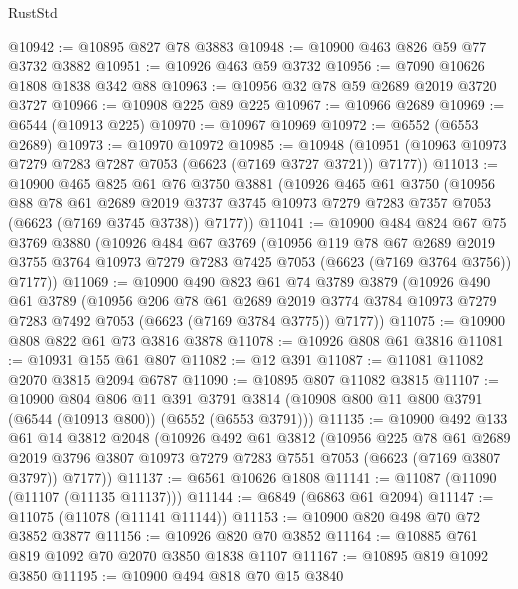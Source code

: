 \begin{lexlean}{RustStd}
\begin{coremodule}
@10942 := @10895 @827 @78 @3883
@10948 := @10900 @463 @826 @59 @77 @3732 @3882
@10951 := @10926 @463 @59 @3732
@10956 := @7090 @10626 @1808 @1838 @342 @88
@10963 := @10956 @32 @78 @59 @2689 @2019 @3720 @3727
@10966 := @10908 @225 @89 @225
@10967 := @10966 @2689
@10969 := @6544 (@10913 @225)
@10970 := @10967 @10969
@10972 := @6552 (@6553 @2689)
@10973 := @10970 @10972
@10985 := @10948 (@10951 (@10963 @10973 @7279 @7283 @7287 @7053 (@6623 (@7169 @3727 @3721)) @7177))
@11013 := @10900
    @465
    @825
    @61
    @76
    @3750
    @3881
    (@10926
      @465
      @61
      @3750
      (@10956
        @88
        @78
        @61
        @2689
        @2019
        @3737
        @3745
        @10973
        @7279
        @7283
        @7357
        @7053
        (@6623 (@7169 @3745 @3738))
        @7177))
@11041 := @10900
    @484
    @824
    @67
    @75
    @3769
    @3880
    (@10926
      @484
      @67
      @3769
      (@10956
        @119
        @78
        @67
        @2689
        @2019
        @3755
        @3764
        @10973
        @7279
        @7283
        @7425
        @7053
        (@6623 (@7169 @3764 @3756))
        @7177))
@11069 := @10900
    @490
    @823
    @61
    @74
    @3789
    @3879
    (@10926
      @490
      @61
      @3789
      (@10956
        @206
        @78
        @61
        @2689
        @2019
        @3774
        @3784
        @10973
        @7279
        @7283
        @7492
        @7053
        (@6623 (@7169 @3784 @3775))
        @7177))
@11075 := @10900 @808 @822 @61 @73 @3816 @3878
@11078 := @10926 @808 @61 @3816
@11081 := @10931 @155 @61 @807
@11082 := @12 @391
@11087 := @11081 @11082 @2070 @3815 @2094 @6787
@11090 := @10895 @807 @11082 @3815
@11107 := @10900
    @804
    @806
    @11
    @391
    @3791
    @3814
    (@10908 @800 @11 @800 @3791 (@6544 (@10913 @800)) (@6552 (@6553 @3791)))
@11135 := @10900
    @492
    @133
    @61
    @14
    @3812
    @2048
    (@10926
      @492
      @61
      @3812
      (@10956
        @225
        @78
        @61
        @2689
        @2019
        @3796
        @3807
        @10973
        @7279
        @7283
        @7551
        @7053
        (@6623 (@7169 @3807 @3797))
        @7177))
@11137 := @6561 @10626 @1808
@11141 := @11087 (@11090 (@11107 (@11135 @11137)))
@11144 := @6849 (@6863 @61 @2094)
@11147 := @11075 (@11078 (@11141 @11144))
@11153 := @10900 @820 @498 @70 @72 @3852 @3877
@11156 := @10926 @820 @70 @3852
@11164 := @10885 @761 @819 @1092 @70 @2070 @3850 @1838 @1107
@11167 := @10895 @819 @1092 @3850
@11195 := @10900
    @494
    @818
    @70
    @15
    @3840

\end{coremodule}
\end{lexlean}
